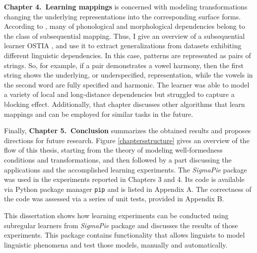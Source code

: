 \textbf{Chapter 4.\ Learning mappings} is concerned with modeling transformations changing the underlying representations into the corresponding surface forms.
According to \cite{Chandlee2014}, many of phonological and morphological dependencies belong to the class of subsequential mapping.
Thus, I give an overview of a subsequential learner OSTIA \citep{OncinaEtAl1993,DeLaHiguera2010}, and use it to extract generalizations from datasets exhibiting different linguistic dependencies.
In this case, patterns are represented as pairs of strings.
So, for example, if a pair demonstrates a vowel harmony, then the first string shows the underlying, or underspecified, representation, while the vowels in the second word are fully specified and harmonic.
The learner was able to model a variety of local and long-distance dependencies but struggled to capture a blocking effect.
Additionally, that chapter discusses other algorithms that learn mappings and can be employed for similar tasks in the future.


Finally, \textbf{Chapter 5.\ Conclusion} summarizes the obtained results and proposes directions for future research.
Figure \ref{chaptersstructure} gives an overview of the flow of this thesis, starting from the theory of modeling well-formedness conditions and transformations, and then followed by a part discussing the applications and the accomplished learning experiments.
The \emph{SigmaPie} package was used in the experiments reported in Chapters 3 and 4.
Its code is available via Python package manager \texttt{pip} and is listed in Appendix A.
The correctness of the code was assessed via a series of unit tests, provided in Appendix B.

This dissertation shows how learning experiments can be conducted using subregular learners from \emph{SigmaPie} package and discusses the results of those experiments.
This package contains functionality that allows linguists to model linguistic phenomena and test those models, manually and automatically.
	

